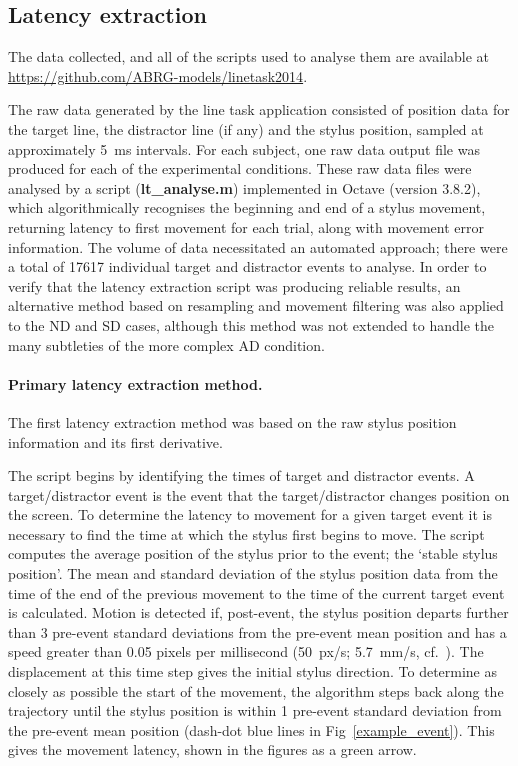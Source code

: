 \documentclass[10pt,letterpaper]{article}
\newcommand{\filename}[1]{\textsf{\textbf{#1}}}
\begin{document}
\subsection*{Latency extraction}
The data collected, and all of the scripts used to analyse them are
available at \url{https://github.com/ABRG-models/linetask2014}.

The raw data generated by the line task application consisted of
position data for the target line, the distractor line (if any) and
the stylus position, sampled at approximately 5~ms intervals. For each
subject, one raw data output file was produced for each of the
experimental conditions.  These raw data files were analysed by a
script (\filename{lt\_analyse.m}) implemented in Octave (version
3.8.2), which algorithmically recognises the beginning and end of a
stylus movement, returning latency to first movement for each trial,
along with movement error information. The volume of data necessitated
an automated approach; there were a total of 17617 individual target
and distractor events to analyse. In order to verify that the latency
extraction script was producing reliable results, an alternative
method based on resampling and movement filtering was also applied to
the ND and SD cases, although this method was not extended to handle
the many subtleties of the more complex AD condition.

\paragraph{Primary latency extraction method.} The first latency extraction
method was based on the raw stylus position information and its first
derivative.

The script begins by identifying the times of target and distractor
events. A target/distractor event is the event that the
target/distractor changes position on the screen. To determine the
latency to movement for a given target event it is necessary to find
the time at which the stylus first begins to move. The script computes
the average position of the stylus prior to the event; the `stable
stylus position'. The mean and standard deviation of the stylus
position data from the time of the end of the previous movement to the
time of the current target event is calculated.  Motion is detected
if, post-event, the stylus position departs further than 3 pre-event
standard deviations from the pre-event mean position and has a speed
greater than 0.05 pixels per millisecond (50~px/s; 5.7~mm/s,
cf.~\cite{prablanc_optimal_1979}).  The displacement at this time step
gives the initial stylus direction. To determine as closely as
possible the start of the movement, the algorithm steps back along the
trajectory until the stylus position is within 1 pre-event standard
deviation from the pre-event mean position (dash-dot blue lines in
Fig~\ref{example_event}). This gives the movement latency, shown in
the figures as a green arrow.
\end{document}
